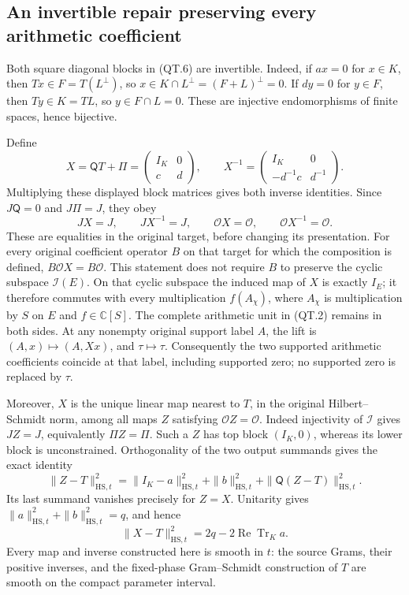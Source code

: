 \subsection{An invertible repair preserving every arithmetic coefficient}

Both square diagonal blocks in (QT.6) are invertible. Indeed, if
\(ax=0\) for \(x\in K\), then \(Tx\in F=T(L^\perp)\), so
\(x\in K\cap L^\perp=(F+L)^\perp=0\).
If \(dy=0\) for \(y\in F\), then \(Ty\in K=TL\), so
\(y\in F\cap L=0\). These are injective endomorphisms of finite
spaces, hence bijective.

Define
\[
 X=\mathsf Q T+\Pi
   =\begin{pmatrix}I_K&0\\c&d\end{pmatrix},\qquad
 X^{-1}=\begin{pmatrix}I_K&0\\-d^{-1}c&d^{-1}\end{pmatrix}.
 \tag{QT.7}\label{eq:qt-repair}
\]
Multiplying these displayed block matrices gives both inverse identities.
Since \(J\mathsf Q=0\) and \(J\Pi=J\), they obey
\[
 JX=J,\qquad JX^{-1}=J,\qquad
 \mathcal OX=\mathcal O,\qquad \mathcal OX^{-1}=\mathcal O.
 \tag{QT.8}\label{eq:qt-preserve}
\]
These are equalities in the original target, before changing its
presentation. For every original coefficient operator \(B\) on that
target for which the composition is defined,
\(B\mathcal OX=B\mathcal O\). This statement does not require \(B\)
to preserve the cyclic subspace \(\mathcal I(E)\). On that cyclic
subspace the induced map of \(X\) is exactly \(I_E\); it therefore
commutes with every multiplication \(f(A_\chi)\), where \(A_\chi\)
is multiplication by \(S\) on \(E\) and \(f\in\mathbb C[S]\).
The complete arithmetic unit in (QT.2) remains in both sides.
At any nonempty original support label \(A\), the lift is
\((A,x)\mapsto(A,Xx)\), and \(\tau\mapsto\tau\). Consequently the
two supported arithmetic coefficients coincide at that label,
including supported zero; no supported zero is replaced by \(\tau\).

Moreover, \(X\) is the unique linear map nearest to \(T\), in the
original Hilbert--Schmidt norm, among all maps \(Z\) satisfying
\(\mathcal OZ=\mathcal O\). Indeed injectivity of \(\mathcal I\) gives
\(JZ=J\), equivalently \(\Pi Z=\Pi\). Such a \(Z\) has top block
\((I_K,0)\), whereas its lower block is unconstrained. Orthogonality
of the two output summands gives the exact identity
\[
 \|Z-T\|_{\mathrm{HS},t}^2
 =\|I_K-a\|_{\mathrm{HS},t}^2+\|b\|_{\mathrm{HS},t}^2
    +\|\mathsf Q(Z-T)\|_{\mathrm{HS},t}^2.
 \tag{QT.9}\label{eq:qt-nearest}
\]
Its last summand vanishes precisely for \(Z=X\). Unitarity gives
\(\|a\|_{\mathrm{HS},t}^2+\|b\|_{\mathrm{HS},t}^2=q\),
and hence
\[
 \|X-T\|_{\mathrm{HS},t}^2
 =2q-2\operatorname{Re}\operatorname{Tr}_K a.
 \tag{QT.10}\label{eq:qt-cost}
\]
Every map and inverse constructed here is smooth in \(t\): the source
Grams, their positive inverses, and the fixed-phase Gram--Schmidt
construction of \(T\) are smooth on the compact parameter interval.

